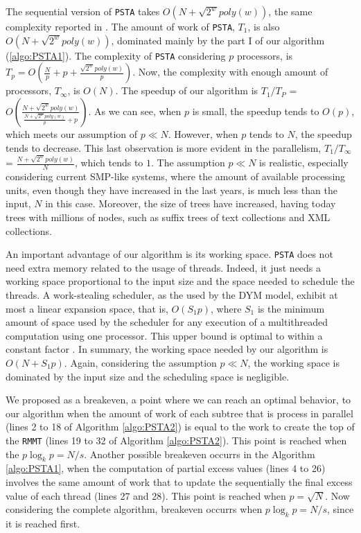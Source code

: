 The sequential version of {\tt PSTA} takes $O(N+\sqrt{2^{w}}poly(w))$, the same complexity reported in \cite{Navarro:2014:FFS:2620785.2601073}. The amount of work of {\tt PSTA}, $T_1$, is also $O(N+\sqrt{2^{w}}poly(w))$, dominated mainly by the part I of our algorithm (\ref{algo:PSTA1}). The complexity of {\tt PSTA} considering $p$ processors, is $T_p = O(\frac{N}{p}+p+\frac{\sqrt{2^{w}}poly(w)}{p})$. Now, the complexity with enough amount of processors, $T_\infty$, is $O(N)$. The speedup of our algorithm is $T_1/T_P$ = $O(\frac{N+\sqrt{2^{w}}poly(w)}{\frac{N+\sqrt{2^{w}}poly(w)}{p}+p})$. As we can see, when $p$ is small, the speedup tends to $O(p)$, which meets our assumption of $p\ll N$. However, when $p$ tends to $N$, the speedup tends to decrease. This last observation is more evident in the parallelism, $T_1/T_{\infty}$ = $\frac{N+\sqrt{2^{w}}poly(w)}{N}$, which tends to $1$. The assumption $p\ll N$ is realistic, especially considering current SMP-like systems, where the amount of available processing units, even though they have increased in the last years, is much less than the input, $N$ in this case. Moreover, the size of trees have increased, having today trees with millions of nodes, such as suffix trees of text collections and XML collections.

An important advantage of our algorithm is its working space. {\tt PSTA} does not need extra memory related to the usage of threads. Indeed, it just needs a working space proportional to the input size and the space needed to schedule the threads. A work-stealing scheduler, as the used by the DYM model, exhibit at most a linear expansion space, that is, $O(S_1p)$, where $S_1$ is the minimum amount of space used by the scheduler for any execution of a multithreaded computation using one processor. This upper bound is optimal to within a constant factor \cite{Blumofe:1999:SMC:324133.324234}. In summary, the working space needed by our algorithm is $O(N+S_1p)$. Again, considering the assumption $p\ll N$, the working space is dominated by the input size and the scheduling space is negligible.

We proposed as a breakeven, a point where we can reach an optimal behavior, to our algorithm when the amount of work of each subtree that is process in parallel (lines 2 to 18 of Algorithm \ref{algo:PSTA2}) is equal to the work to create the top of the {\tt RMMT} (lines 19 to 32 of Algorithm \ref{algo:PSTA2}). This point is reached when the $p\log_{k}p=N/s$. Another possible breakeven occurrs in the Algorithm \ref{algo:PSTA1}, when the computation of partial excess values (lines 4 to 26) involves the same amount of work that to update the sequentially the final excess value of each thread (lines 27 and 28). This point is reached when $p=\sqrt{N}$. Now considering the complete algorithm, breakeven occurrs when $p\log_{k}p=N/s$, since it is reached first.